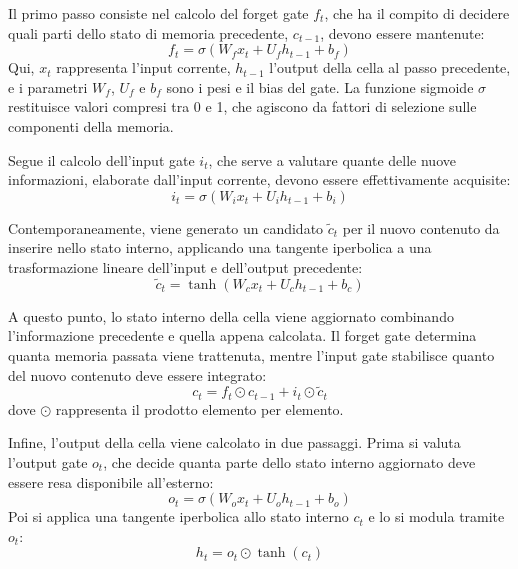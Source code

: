 \documentclass{article}
\begin{document}
Il primo passo consiste nel calcolo del forget gate $f_t$, che ha il compito di decidere quali parti 
dello stato di memoria precedente, $c_{t-1}$, devono essere mantenute:
\begin{equation}
f_t = \sigma(W_f x_t + U_f h_{t-1} + b_f)
\end{equation}
Qui, $x_t$ rappresenta l’input corrente, $h_{t-1}$ l’output della cella al passo precedente, e i 
parametri $W_f$, $U_f$ e $b_f$ sono i pesi e il bias del gate. La funzione sigmoide $\sigma$ restituisce 
valori compresi tra 0 e 1, che agiscono da fattori di selezione sulle componenti della memoria.

Segue il calcolo dell’input gate $i_t$, che serve a valutare quante delle nuove informazioni, elaborate 
dall’input corrente, devono essere effettivamente acquisite:
\begin{equation}
i_t = \sigma(W_i x_t + U_i h_{t-1} + b_i)
\end{equation}

Contemporaneamente, viene generato un candidato $\tilde{c}_t$ per il nuovo contenuto da inserire nello 
stato interno, applicando una tangente iperbolica a una trasformazione lineare dell’input e dell’output 
precedente:
\begin{equation}
\tilde{c}_t = \tanh(W_c x_t + U_c h_{t-1} + b_c)
\end{equation}

A questo punto, lo stato interno della cella viene aggiornato combinando l’informazione precedente e 
quella appena calcolata. Il forget gate determina quanta memoria passata viene trattenuta, mentre 
l’input gate stabilisce quanto del nuovo contenuto deve essere integrato:
\begin{equation}
c_t = f_t \odot c_{t-1} + i_t \odot \tilde{c}_t
\end{equation}
dove $\odot$ rappresenta il prodotto elemento per elemento.

Infine, l’output della cella viene calcolato in due passaggi. Prima si valuta l’output gate $o_t$, che 
decide quanta parte dello stato interno aggiornato deve essere resa disponibile all’esterno:
\begin{equation}
o_t = \sigma(W_o x_t + U_o h_{t-1} + b_o)
\end{equation}
Poi si applica una tangente iperbolica allo stato interno $c_t$ e lo si modula tramite $o_t$:
\begin{equation}
h_t = o_t \odot \tanh(c_t)
\end{equation}
\end{document}
